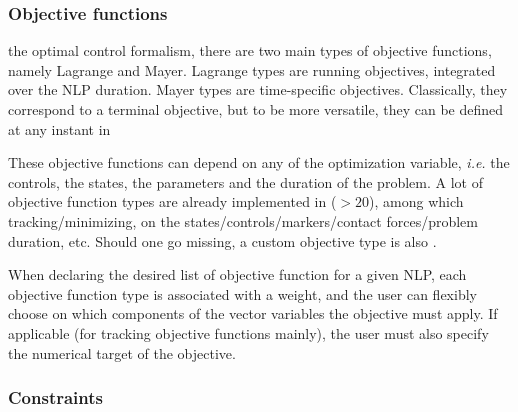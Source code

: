 \subsubsection{Objective functions}
 the optimal control formalism, there are two main types of objective functions, namely Lagrange and Mayer. Lagrange types are running objectives, integrated over the NLP duration. Mayer types are time-specific objectives. Classically, they correspond to a terminal objective, but to be more versatile, they can be defined at any instant in \bioptim{}

These objective functions can depend on any of the optimization variable, \textit{i.e.} the controls, the states, the parameters and the duration of the problem. A lot of objective function types are already implemented in \bioptim ($>\!20$), among which tracking/minimizing, on the states/controls/markers/contact forces/problem duration, etc. Should one go missing, a custom objective type is also .

When declaring the desired list of objective function for a given NLP, each objective function type is associated with a weight, and the user can flexibly choose on which components of the vector variables the objective must apply. If applicable (for tracking objective functions mainly), the user must also specify the numerical target of the objective.

\subsubsection{Constraints}
